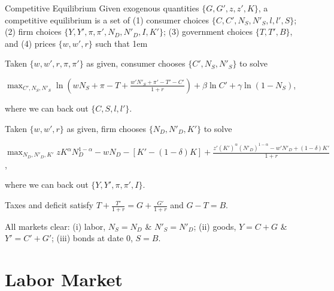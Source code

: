 \documentclass[11pt,aspectratio=43]{beamer}
\let\oldenumerate=\enumerate
\let\endoldenumerate=\endenumerate
\renewenvironment{enumerate}{\oldenumerate \itemsep1em}{ \endoldenumerate}
\theoremstyle{definition}
\begin{document}
\begin{frame}{Competitive Equilibrium}
\label{slide:Competitive_Equilibrium}
    \scriptsize
    Given exogenous quantities $ \{ G, G', z, z', K \} $, a competitive equilibrium is a set of (1) consumer choices $ \{ C, C', N_{S}, N'_{S}, l, l', S \} $; (2) firm choices $ \{ Y, Y', \pi, \pi', N_{D}, N'_{D}, I, K' \} $; (3) government choices $ \{ T, T', B \} $, and (4) prices $ \{ w, w', r \} $ such that
    \begin{enumerate}
        \item Taken $ \{ w, w', r, \pi, \pi' \} $ as given, consumer chooses $ \{ C', N_{S}, N'_{S} \} $ to solve
            \begin{center}
                $
                \displaystyle
                \max_{C', N_{S}, N'_{S}} \ln \left(
                    w N_{S} + \pi - T +
                    \frac{w' N'_{S} + \pi' - T' - C'}{1+r}
                \right) + \beta \ln C' + \gamma \ln ( 1-N_{S} )
                $,
            \end{center}
            where we can back out $ \{ C, S, l, l' \} $.
        \item Taken $ \{ w, w', r \} $ as given, firm chooses $ \{ N_{D}, N'_{D}, K' \} $ to solve
            \begin{center}
                $
                \displaystyle
                \max_{N_{D}, N'_{D}, K'} z K^{\alpha} N_{D}^{1-\alpha} - w N_{D} - [ K' - ( 1-\delta ) K ] + \frac{z' ( K' )^{\alpha}( N'_{D} )^{1-\alpha} - w' N'_{D} + ( 1-\delta ) K'}{1+r}
                $,
            \end{center}
            where we can back out $ \{ Y, Y', \pi, \pi', I \} $.
        \item Taxes and deficit satisfy $ \displaystyle T + \frac{T'}{1+r} = G + \frac{G'}{1+r} $ and $ G - T = B $.
        \item All markets clear: (i) labor, $ N_{S} = N_{D} $ \& $ N'_{S} = N'_{D} $; (ii) goods, $ Y = C + G $ \& $Y' = C' + G' $; (iii) bonds at date 0, $ S = B $.
    \end{enumerate}
\end{frame}

\section{Labor Market}
\label{sec:Labor_Market}
\end{document}
